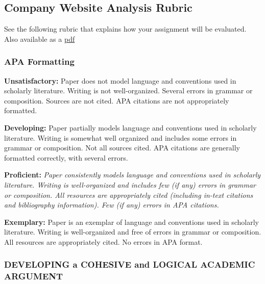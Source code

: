 \documentclass[
]{book}
\begin{document}
\hypertarget{company-website-analysis-rubric}{%
\subsection*{Company Website Analysis Rubric}\label{company-website-analysis-rubric}}

See the following rubric that explains how your assignment will be evaluated. Also available as a \href{assets/assessment/Company-Website-Analysis-RUBRIC.pdf}{pdf}

\hypertarget{apa-formatting}{%
\subsubsection*{APA Formatting}\label{apa-formatting}}

\textbf{Unsatisfactory:} Paper does not model language and conventions used in scholarly literature.
Writing is not well-organized. Several errors in grammar or composition. Sources
are not cited. APA citations are not appropriately formatted.

\textbf{Developing:} Paper partially models language and conventions used in scholarly literature.
Writing is somewhat well organized and includes some errors in grammar or
composition. Not all sources cited. APA citations are generally formatted
correctly, with several errors.

\textbf{Proficient:} \emph{Paper consistently models language and conventions used in scholarly
literature. Writing is well-organized and includes few (if any) errors in
grammar or composition. All resources are appropriately cited (including in-text
citations and bibliography information). Few (if any) errors in APA citations.}

\textbf{Exemplary:} Paper is an exemplar of language and conventions used in scholarly literature.
Writing is well-organized and free of errors in grammar or composition. All
resources are appropriately cited. No errors in APA format.

\hypertarget{developing-a-cohesive-and-logical-academic-argument-1}{%
\subsubsection*{DEVELOPING a COHESIVE and LOGICAL ACADEMIC ARGUMENT}\label{developing-a-cohesive-and-logical-academic-argument-1}}
\end{document}

